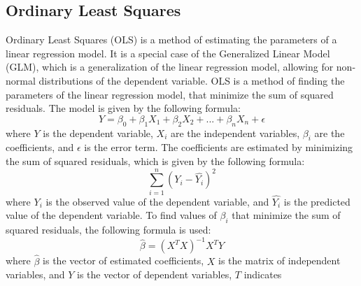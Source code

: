 \documentclass[12pt]{report}
\begin{document}
\subsection{Ordinary Least Squares}
Ordinary Least Squares (OLS) is a method of estimating the parameters of a linear regression model. It is a special case of the Generalized Linear Model (GLM), which is a generalization of the linear regression model, allowing for non-normal distributions of the dependent variable. OLS is a method of finding the parameters of the linear regression model, that minimize the sum of squared residuals. The model is given by the following formula:
\begin{equation}
	Y = \beta_0 + \beta_1 X_1 + \beta_2 X_2 + ... + \beta_n X_n + \epsilon
\end{equation}
where $Y$ is the dependent variable, $X_i$ are the independent variables, $\beta_i$ are the coefficients, and $\epsilon$ is the error term. The coefficients are estimated by minimizing the sum of squared residuals, which is given by the following formula:
\begin{equation}
	\sum_{i=1}^{n} (Y_i - \hat{Y_i})^2
\end{equation}
where $Y_i$ is the observed value of the dependent variable, and $\hat{Y_i}$ is the predicted value of the dependent variable. To find values of \(\beta_i\) that minimize the sum of squared residuals, the following formula is used:
\begin{equation}
	\hat{\beta} = (X^T X)^{-1} X^T Y
\end{equation}
where $\hat{\beta}$ is the vector of estimated coefficients, $X$ is the matrix of independent variables, and $Y$ is the vector of dependent variables, $T$ indicates
\end{document}
